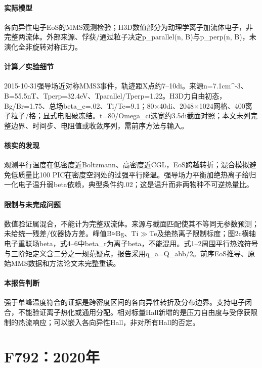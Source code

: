 \paragraph{实际模型}各向异性电子EoS的MMS观测检验；H3D数值部分为动理学离子加流体电子，非完整两流体。外部来源、俘获/通过粒子决定p\_parallel(n, B)与p\_perp(n, B)，未演化全非旋转对称压力。

\paragraph{计算／实验细节}2015-10-31强导场近对称MMS3事件，轨迹距X点约7–10di。来源n=7.1cm\textasciicircum{}-3、B=55.5nT、Tperp=32.4eV、Tparallel/Tperp=1.22。H3D力自由初态，Bg/Br=1.75、总场beta\_e=.02、Ti/Te=9.1；80×40di、2048×1024网格、400离子粒子/格；显式电阻破冻结。t=80/Omega\_ci选宽约3.5di截面对照；本文未列完整边界、时间步、电阻值或收敛序列，需前序方法与输入。

\paragraph{核实的发现}观测平行温度在低密度近Boltzmann、高密度近CGL，EoS跨越转折；混合模拟避免低质量比100 PIC在密度空洞处的过强平行降温。强导场力平衡加绝热离子给归一化电子温升弱beta依赖，典型条件约.02；这是温升而非两物种不可逆热量比。

\paragraph{限制与未完成问题}数值验证属混合，不能计为完整双流体。来源与截面匹配使其不等同无参数预测；未给统一残差/仪器协方差。峰值B≈Bg、Ti\ensuremath{\gg}Te及绝热离子限制标度；图2c横轴电子重联场beta，式4–6中beta\_r为离子beta，不能混用。式1–2周围平行热流符号与三阶矩定义含二分之一规范疑点，报告采用q\_a=Q\_abb/2。前序EoS推导、原始MMS数据和方法论文未完整重读。

\paragraph{本报告判断}强于单峰温度符合的证据是跨密度区间的各向异性转折及分布边界。支持电子闭合，不能验证离子热化或通用分配。相对标量Hall新增的是压力自由度与受俘获限制的热流响应；可以嵌入各向异性Hall，非对所有Hall的否定。

\section{F792：2020年}\label{paper:F792}


